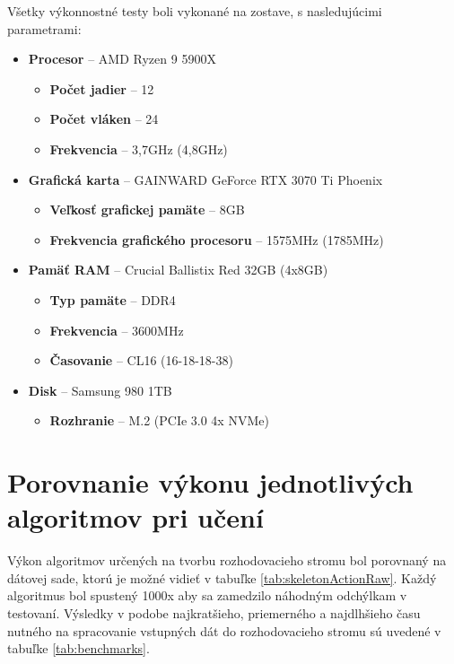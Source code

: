 \documentclass[slovak, master]{diploma}
\begin{document}
Všetky výkonnostné testy boli vykonané na zostave, s nasledujúcimi parametrami:
\begin{itemize}
    \item \textbf{Procesor} -- AMD Ryzen 9 5900X
    \begin{itemize}
        \item \textbf{Počet jadier} -- 12
        \item \textbf{Počet vláken} -- 24
        \item \textbf{Frekvencia} -- 3,7GHz (4,8GHz)
    \end{itemize}
    \item \textbf{Grafická karta} -- GAINWARD GeForce RTX 3070 Ti Phoenix
    \begin{itemize}
        \item \textbf{Veľkosť grafickej pamäte} -- 8GB
        \item \textbf{Frekvencia grafického procesoru} -- 1575MHz (1785MHz)
    \end{itemize}
    \item \textbf{Pamäť RAM} -- Crucial Ballistix Red 32GB (4x8GB)
    \begin{itemize}
        \item \textbf{Typ pamäte} -- DDR4
        \item \textbf{Frekvencia} -- 3600MHz
        \item \textbf{Časovanie} -- CL16 (16-18-18-38)
    \end{itemize}
    \item \textbf{Disk} -- Samsung 980 1TB
    \begin{itemize}
        \item \textbf{Rozhranie} -- M.2 (PCIe 3.0 4x NVMe)
    \end{itemize}
\end{itemize}

\section{Porovnanie výkonu jednotlivých algoritmov pri učení}
\label{sec:id3d45cart}
Výkon algoritmov určených na tvorbu rozhodovacieho stromu bol porovnaný na dátovej sade, ktorú je možné vidieť v tabuľke \ref{tab:skeletonActionRaw}. Každý algoritmus bol spustený 1000x aby sa zamedzilo náhodným odchýlkam v testovaní. Výsledky v podobe najkratšieho, priemerného a najdlhšieho času nutného na spracovanie vstupných dát do rozhodovacieho stromu sú uvedené v tabuľke \ref{tab:benchmarks}.
\end{document}
